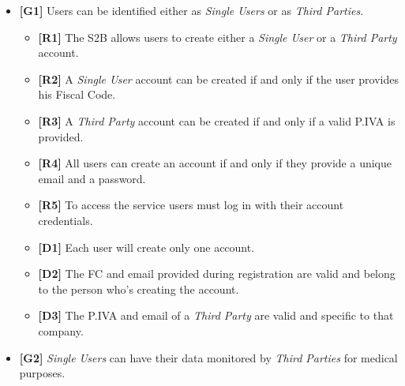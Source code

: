 \documentclass[titlepage]{article}
\begin{document}
			\begin{itemize} %

   				 \item {\bf [G1]} Users can be identified either as {\it {\it Single User}s} or as {\it Third Parties}.	
				 
				 	\begin{itemize} %
						\item {\bf[R1]} The S2B allows users to create either a {\it Single User} or a {\it Third Party} account. 
\item {\bf[R2]}  A {\it Single User} account can be created if and only if the user provides his Fiscal Code. 
\item {\bf[R3]}  A {\it Third Party} account can be created if and only if a valid P.IVA is provided. 
\item {\bf[R4]}  All users can create an account if and only if they provide a unique email and a password. 
\item {\bf[R5]}  To access the service users must log in with their account credentials. 
\item {\bf[D1]}  Each user will create only one account.
\item {\bf[D2]}  The FC and email provided during registration are valid and belong to the person who’s creating the account.
\item {\bf[D3]}  The P.IVA and email of a {\it Third Party} are valid and specific to that company.
					\end{itemize}
   				 \item {\bf [G2]}  {\it {\it Single User}s} can have their data monitored by {\it Third Parties} for medical purposes.
				 

\end{itemize}
\end{document}

